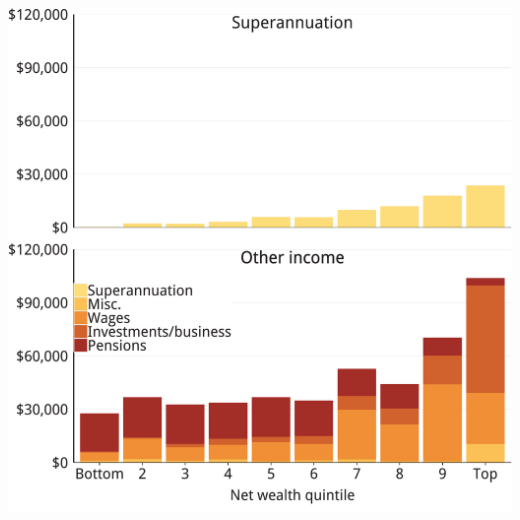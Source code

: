 \documentclass[tikz]{standalone}\usepackage[]{graphicx}\usepackage[]{color}
\newenvironment{knitrout}{}{} %
\begin{document}
\begin{knitrout}
\color{fgcolor}
\includegraphics[width=11.000in,height=11in]{./Super-tax-targeting/b5-super-atlas/Figure3-3-detailed-1} 

\end{knitrout}
\end{document}
